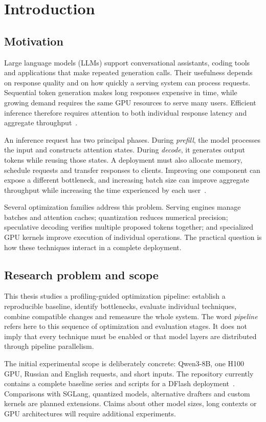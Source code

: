 \chapter{Introduction}
\label{chap:intro}

\section{Motivation}
Large language models (LLMs) support conversational assistants, coding tools and applications that make repeated generation calls. Their usefulness depends on response quality and on how quickly a serving system can process requests. Sequential token generation makes long responses expensive in time, while growing demand requires the same GPU resources to serve many users. Efficient inference therefore requires attention to both individual response latency and aggregate throughput~\cite{vllm,dflash}.

An inference request has two principal phases. During \emph{prefill}, the model processes the input and constructs attention states. During \emph{decode}, it generates output tokens while reusing those states. A deployment must also allocate memory, schedule requests and transfer responses to clients. Improving one component can expose a different bottleneck, and increasing batch size can improve aggregate throughput while increasing the time experienced by each user~\cite{sarathi}.

Several optimization families address this problem. Serving engines manage batches and attention caches; quantization reduces numerical precision; speculative decoding verifies multiple proposed tokens together; and specialized GPU kernels improve execution of individual operations. The practical question is how these techniques interact in a complete deployment.

\section{Research problem and scope}
This thesis studies a profiling-guided optimization pipeline: establish a reproducible baseline, identify bottlenecks, evaluate individual techniques, combine compatible changes and remeasure the whole system. The word \emph{pipeline} refers here to this sequence of optimization and evaluation stages. It does not imply that every technique must be enabled or that model layers are distributed through pipeline parallelism.

The initial experimental scope is deliberately concrete: Qwen3-8B, one H100 GPU, Russian and English requests, and short inputs. The repository currently contains a complete baseline series and scripts for a DFlash deployment~\cite{repo,baseline}. Comparisons with SGLang, quantized models, alternative drafters and custom kernels are planned extensions. Claims about other model sizes, long contexts or GPU architectures will require additional experiments.

